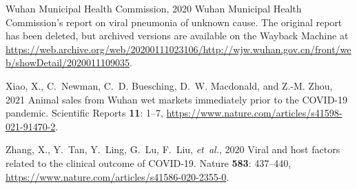\documentclass[9pt,twocolumn,twoside]{gsajnl_modified}
\begin{document}
{\begin{thebibliography}{44}
{{Wuhan Municipal Health Commission}}, 2020 {Wuhan Municipal Health
  Commission's report on viral pneumonia of unknown cause}. The original report
  has been deleted, but archived versions are available on the Wayback Machine
  at
  \url{https://web.archive.org/web/20200111023106/http://wjw.wuhan.gov.cn/front/web/showDetail/2020011109035}.

{Xiao, X., C.~Newman, C.~D. Buesching, D.~W. Macdonald, {\rm and} Z.-M. Zhou},
  2021 {Animal sales from Wuhan wet markets immediately prior to the COVID-19
  pandemic}. Scientific Reports {\bf 11}: 1--7,
  \url{https://www.nature.com/articles/s41598-021-91470-2}.

{Zhang, X., Y.~Tan, Y.~Ling, G.~Lu, F.~Liu, {\em et~al.\/}}, 2020 Viral and
  host factors related to the clinical outcome of {COVID-19}. Nature {\bf 583}:
  437--440, \url{https://www.nature.com/articles/s41586-020-2355-0}.

\end{thebibliography}

}
\end{document}
